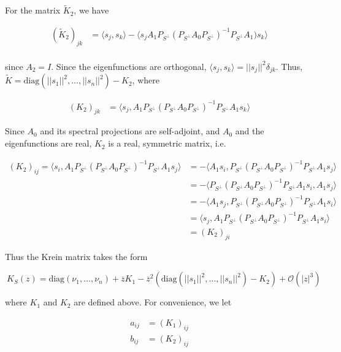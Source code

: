 \documentclass[12pt]{article}
\begin{document}
For the matrix $\tilde{K}_2$, we have 

\begin{align*}
(\tilde{K}_2)_{jk} &= \langle s_j, s_k \rangle - \langle s_j A_1 P_{S^\perp} (P_{S^\perp} A_0 P_{S^\perp})^{-1} P_{S^\perp} A_1 ) s_k  \rangle \\
\end{align*}

since $A_2 = I$. Since the eigenfunctions are orthogonal, $\langle s_j, s_k \rangle = ||s_j||^2 \delta_{jk}$. Thus, $\tilde{K} = \text{diag}(||s_1||^2, \dots, ||s_n||^2 ) - K_2$, where

\begin{align*}
(K_2)_{jk} &= 
\langle s_j, A_1 P_{S^\perp} (P_{S^\perp} A_0 P_{S^\perp})^{-1} P_{S^\perp} A_1 s_k \rangle
\end{align*}


Since $A_0$ and its spectral projections are self-adjoint, and $A_0$ and the eigenfunctions are real, $K_2$ is a real, symmetric matrix, i.e.

\begin{align*}
(K_2)_{ij} =
\langle s_i, A_1 P_{S^\perp} (P_{S^\perp} A_0 P_{S^\perp})^{-1} P_{S^\perp} A_1 s_j \rangle &= -\langle A_1 s_i, P_{S^\perp} (P_{S^\perp} A_0 P_{S^\perp})^{-1} P_{S^\perp} A_1 s_j \rangle \\
&= -\langle P_{S^\perp} (P_{S^\perp} A_0 P_{S^\perp})^{-1} P_{S^\perp} A_1 s_i, A_1 s_j \rangle \\
&= -\langle A_1 s_j, P_{S^\perp} (P_{S^\perp} A_0 P_{S^\perp})^{-1} P_{S^\perp} A_1 s_i \rangle \\
&= \langle s_j, A_1 P_{S^\perp} (P_{S^\perp} A_0 P_{S^\perp})^{-1} P_{S^\perp} A_1 s_i \rangle \\
&= (K_2)_{ji}
\end{align*}

Thus the Krein matrix takes the form

\begin{equation}\
K_S(z) = \text{diag}(\nu_1, \dots, \nu_n) + \overline{z} K_1 
- \overline{z}^2 ( \text{diag}(||s_1||^2, \dots, ||s_n||^2 ) - K_2) + \mathcal{O}(|z|^3)
\end{equation}

where $K_1$ and $K_2$ are defined above. For convenience, we let

\begin{align*}
a_{ij} &= (K_1)_{ij} \\
b_{ij} &= (K_2)_{ij}
\end{align*}
\end{document}

